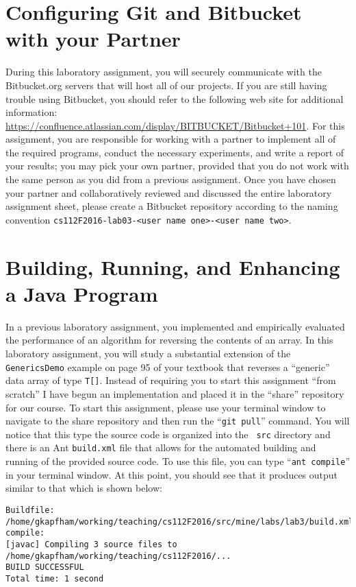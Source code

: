 \section*{Configuring Git and Bitbucket with your Partner}

During this laboratory assignment, you will securely communicate with the Bitbucket.org servers that will host all of
our projects.  If you are still having trouble using Bitbucket, you should refer to the following web site for
additional information: \url{https://confluence.atlassian.com/display/BITBUCKET/Bitbucket+101}.  For this assignment,
you are responsible for working with a partner to implement all of the required programs, conduct the necessary
experiments, and write a report of your results; you may pick your own partner, provided that you do not work with the
same person as you did from a previous assignment. Once you have chosen your partner and collaboratively reviewed and
discussed the entire laboratory assignment sheet, please create a Bitbucket repository according to the naming
convention {\tt cs112F2016-lab03-<user name one>-<user name two>}.

\section*{Building, Running, and Enhancing a Java Program}

In a previous laboratory assignment, you implemented and empirically evaluated the performance of an algorithm for
reversing the contents of an array. In this laboratory assignment, you will study a substantial extension of the {\tt
GenericsDemo} example on page 95 of your textbook that reverses a ``generic'' data array of type {\tt T[]}. Instead of
requiring you to start this assignment ``from scratch'' I have begun an implementation and placed it in the ``share''
repository for our course. To start this assignment, please use your terminal window to navigate to the share repository
and then run the ``{\tt git pull}'' command. You will notice that this type the source code is organized into the {\tt
src} directory and there is an Ant {\tt build.xml} file that allows for the automated building and running of the
provided source code. To use this file, you can type ``{\tt ant compile}'' in your terminal window. At this point, you
should see that it produces output similar to that which is shown below:

\vspace*{-.1in}

\begin{verbatim}
Buildfile: /home/gkapfham/working/teaching/cs112F2016/src/mine/labs/lab3/build.xml
compile:
[javac] Compiling 3 source files to /home/gkapfham/working/teaching/cs112F2016/...
BUILD SUCCESSFUL
Total time: 1 second
\end{verbatim}

